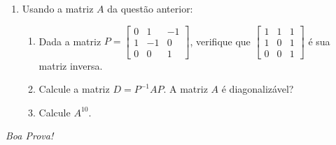 \documentclass[a4paper,5pt]{amsbook}
\begin{document}
\begin{enumerate}
	\vspace{0.5cm}
	\item Usando a matriz $A$ da quest\~ao anterior:
		\begin{enumerate}
			\vspace{0.3cm}
			\item Dada a matriz
				$P=\left[\begin{array}{ccc}
						0 & 1 & -1 \\
						1 & -1 & 0 \\
						0 & 0 &  1
					\end{array}\right]$,
						verifique que
				$\left[\begin{array}{ccc}
						1 & 1 & 1 \\
						1 & 0 & 1 \\
						0 & 0 & 1
					\end{array}\right]$
				\'e sua matriz inversa.
			\vspace{0.2cm}
			\item Calcule a matriz $D = P^{-1}AP$. A matriz $A$ \'e diagonaliz\'avel?
			\vspace{0.5cm}
			\item Calcule $A^{10}$.
		\end{enumerate}
\end{enumerate}

\begin{flushright}
	\vspace{1cm}
	\textit{Boa Prova!}
\end{flushright}
\end{document}
